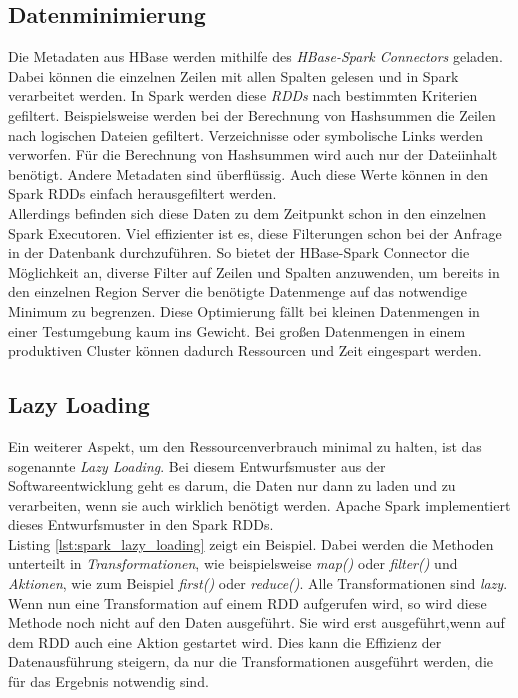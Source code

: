\subsection*{Datenminimierung}
Die Metadaten aus HBase werden mithilfe des \textit{HBase-Spark Connectors} geladen. Dabei können die einzelnen Zeilen mit allen Spalten gelesen und in Spark verarbeitet werden. In Spark werden diese \textit{RDDs} nach bestimmten Kriterien gefiltert. Beispielsweise werden bei der Berechnung von Hashsummen die Zeilen nach logischen Dateien gefiltert. Verzeichnisse oder symbolische Links werden verworfen. 
Für die Berechnung von Hashsummen wird auch nur der Dateiinhalt benötigt. Andere Metadaten sind überflüssig. Auch diese Werte können in den Spark RDDs einfach herausgefiltert werden.\\ Allerdings befinden sich diese Daten zu dem Zeitpunkt schon in den einzelnen Spark Executoren. Viel effizienter ist es, diese Filterungen schon bei der Anfrage in der Datenbank durchzuführen. So bietet der HBase-Spark Connector die Möglichkeit an, diverse Filter auf Zeilen und Spalten anzuwenden, um bereits in den einzelnen Region Server die benötigte Datenmenge auf das notwendige Minimum zu begrenzen. Diese Optimierung fällt bei kleinen Datenmengen in einer Testumgebung kaum ins Gewicht. Bei großen Datenmengen in einem produktiven Cluster können dadurch Ressourcen und Zeit eingespart werden.\\

\subsection*{Lazy Loading}
Ein weiterer Aspekt, um den Ressourcenverbrauch minimal zu halten, ist das sogenannte \textit{Lazy Loading}. Bei diesem Entwurfsmuster aus der Softwareentwicklung geht es darum, die Daten nur dann zu laden und zu verarbeiten, wenn sie auch wirklich benötigt werden. Apache Spark implementiert dieses Entwurfsmuster in den Spark RDDs.\cite{spark_rdd}\\
Listing \ref{lst:spark_lazy_loading} zeigt ein Beispiel. Dabei werden die Methoden unterteilt in \textit{Transformationen}, wie beispielsweise \textit{map()} oder \textit{filter()} und \textit{Aktionen}, wie zum Beispiel \textit{first()} oder \textit{reduce()}. Alle Transformationen sind \textit{lazy}. Wenn nun eine Transformation auf einem RDD aufgerufen wird, so wird diese Methode noch nicht auf den Daten ausgeführt. Sie wird erst ausgeführt,wenn auf dem RDD auch eine Aktion gestartet wird. Dies kann die Effizienz der Datenausführung steigern, da nur die Transformationen ausgeführt werden, die für das Ergebnis notwendig sind.

